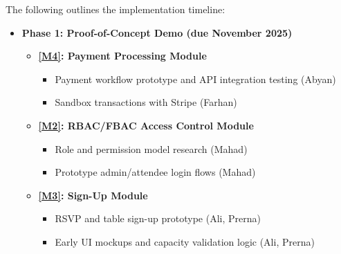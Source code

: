 \documentclass[12pt, titlepage]{article}
\begin{document}
\noindent
The following outlines the implementation timeline:

\begin{itemize}
    \item \textbf{Phase 1: Proof-of-Concept Demo (due November 2025)}  
    \begin{itemize}
        \item \textbf{\ref{M4}: Payment Processing Module}
        \begin{itemize}
            \item Payment workflow prototype and API integration testing (Abyan)  
            \item Sandbox transactions with Stripe (Farhan)
        \end{itemize}
        \item \textbf{\ref{M2}: RBAC/FBAC Access Control Module}  
        \begin{itemize}
            \item Role and permission model research (Mahad)  
            \item Prototype admin/attendee login flows (Mahad)
        \end{itemize}
        \item \textbf{\ref{M3}: Sign-Up Module}  
        \begin{itemize}
            \item RSVP and table sign-up prototype (Ali, Prerna)  
            \item Early UI mockups and capacity validation logic (Ali, Prerna)
        \end{itemize}
    \end{itemize}


\end{itemize}
\end{document}
